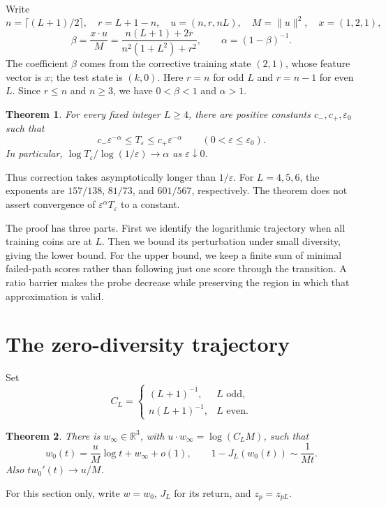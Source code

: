 \documentclass[11pt]{article}
\newtheorem{theorem}{Theorem}\newtheorem{lemma}{Lemma}
\newcommand{\eps}{\varepsilon}\newcommand{\R}{\mathbb R}
\begin{document}
Write
\[
 n=\lceil(L+1)/2\rceil,\quad r=L+1-n,\quad
 u=(n,r,nL),\quad M=\|u\|^2,\quad x=(1,2,1),
\]
\[
 \beta=\frac{x\cdot u}{M}=\frac{n(L+1)+2r}{n^2(1+L^2)+r^2},\qquad
 \alpha=(1-\beta)^{-1}.
\]
The coefficient $\beta$ comes from the corrective training state $(2,1)$,
whose feature vector is $x$; the test state is $(k,0)$.
Here $r=n$ for odd $L$ and $r=n-1$ for even $L$. Since $r\le n$ and
$n\ge3$, we have $0<\beta<1$ and $\alpha>1$.

\begin{theorem}\label{thm:rate}
For every fixed integer $L\ge4$, there are positive constants
$c_-,c_+,\eps_0$ such that
\[
 c_-\eps^{-\alpha}\le T_\eps\le c_+\eps^{-\alpha}
 \qquad(0<\eps\le\eps_0).
\]
In particular, $\log T_\eps/\log(1/\eps)\to\alpha$ as $\eps\downarrow0$.
\end{theorem}
Thus correction takes asymptotically longer than $1/\eps$. For $L=4,5,6$,
the exponents are $157/138$, $81/73$, and $601/567$, respectively. The theorem
does not assert convergence of $\eps^\alpha T_\eps$ to a constant.

The proof has three parts. First we identify the logarithmic trajectory
when all training coins are at $L$. Then we bound its perturbation under
small diversity, giving the lower bound. For the upper bound, we keep a
finite sum of minimal failed-path scores rather than following just one
score through the transition. A ratio barrier makes the probe decrease
while preserving the region in which that approximation is valid.

\section{The zero-diversity trajectory}\label{sec:ray}
Set
\[
 C_L=\begin{cases}(L+1)^{-1},&L\text{ odd},\\n(L+1)^{-1},&L\text{ even}.
 \end{cases}
\]
\begin{theorem}\label{ray:thm:ray}
There is $w_\infty\in\R^3$, with $u\cdot w_\infty=\log(C_LM)$, such that
\begin{equation}\label{eq:ray}
 w_0(t)=\frac uM\log t+w_\infty+o(1),\qquad
 1-J_L(w_0(t))\sim\frac1{Mt}.
\end{equation}
Also $t w_0'(t)\to u/M$.
\end{theorem}
For this section only, write $w=w_0$, $J_L$ for its return, and $z_p=z_{pL}$.
\end{document}
